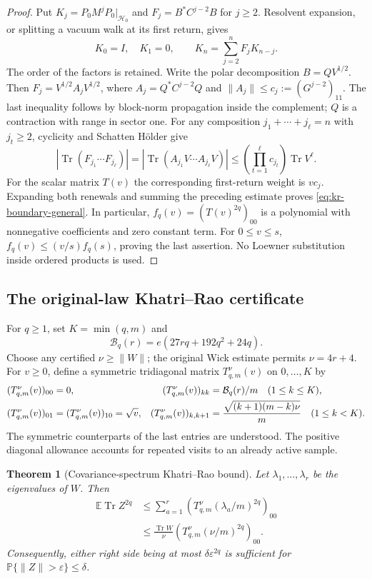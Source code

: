 \documentclass[11pt,a4paper]{article}
\newtheorem{theorem}{Theorem}[section]
\theoremstyle{definition}\newtheorem{definition}[theorem]{Definition}
\theoremstyle{remark}\newtheorem{remark}[theorem]{Remark}
\numberwithin{equation}{section}
\begin{document}
\begin{proof}
Put $K_j=P_0M^jP_0|_{\mathcal H_0}$ and $F_j=B^*C^{j-2}B$ for $j\ge2$.
Resolvent expansion, or splitting a vacuum walk at its first return, gives
\[
 K_0=I,\quad K_1=0,\qquad K_n=\sum_{j=2}^n F_jK_{n-j}.
\]
The order of the factors is retained. Write the polar decomposition
$B=QV^{1/2}$. Then
$F_j=V^{1/2}A_jV^{1/2}$, where
$A_j=Q^*C^{j-2}Q$ and $\|A_j\|\le c_j:=(G^{j-2})_{11}$.
The last inequality follows by block-norm propagation inside the complement;
$Q$ is a contraction with range in sector one.
For any composition $j_1+\cdots+j_\ell=n$ with $j_t\ge2$, cyclicity and
Schatten H\"older give
\[
 \left|\operatorname{Tr}(F_{j_1}\cdots F_{j_\ell})\right|
 =\left|\operatorname{Tr}(A_{j_1}V\cdots A_{j_\ell}V)\right|
 \le\left(\prod_{t=1}^{\ell}c_{j_t}\right)\operatorname{Tr}V^\ell.
\]
For the scalar matrix $T(v)$ the corresponding first-return weight is
$v c_j$. Expanding both renewals and summing the preceding estimate proves
\eqref{eq:kr-boundary-general}. In particular,
$f_q(v)=(T(v)^{2q})_{00}$ is a polynomial with nonnegative coefficients and
zero constant term. For $0\le v\le s$, $f_q(v)\le(v/s)f_q(s)$, proving the
last assertion. No Loewner substitution inside ordered products is used.
\end{proof}

\subsection{The original-law Khatri--Rao certificate}

For $q\ge1$, set $K=\min(q,m)$ and
\[
 \mathcal B_q(r)=e(27rq+192q^2+24q).
\]
Choose any certified $\nu\ge\|W\|$; the original Wick estimate permits
$\nu=4r+4$. For $v\ge0$, define a symmetric tridiagonal matrix
$T_{q,m}^{\nu}(v)$ on $0,\ldots,K$ by
\begin{align}
 (T_{q,m}^{\nu}(v))_{00}&=0,&
 (T_{q,m}^{\nu}(v))_{kk}&=\mathcal B_q(r)/m\quad(1\le k\le K),\notag\\
 (T_{q,m}^{\nu}(v))_{01}&=(T_{q,m}^{\nu}(v))_{10}=\sqrt v,&
 (T_{q,m}^{\nu}(v))_{k,k+1}
 &=\frac{\sqrt{(k+1)(m-k)\nu}}m\quad(1\le k<K).
 \label{eq:kr-T}
\end{align}
The symmetric counterparts of the last entries are understood. The positive
diagonal allowance accounts for repeated visits to an already active sample.

\begin{theorem}[Covariance-spectrum Khatri--Rao bound]\label{thm:kr-spectrum}
Let $\lambda_1,\ldots,\lambda_r$ be the eigenvalues of $W$. Then
\begin{align}
 \mathbb E\operatorname{Tr}Z^{2q}
 &\le\sum_{a=1}^r
   \left(T_{q,m}^{\nu}(\lambda_a/m)^{2q}\right)_{00}
 \label{eq:kr-spectrum}\\
 &\le\frac{\operatorname{Tr}W}{\nu}
   \left(T_{q,m}^{\nu}(\nu/m)^{2q}\right)_{00}.
 \label{eq:kr-effective}
\end{align}
Consequently, either right side being at most $\delta\varepsilon^{2q}$
is sufficient for $\mathbb P\{\|Z\|>\varepsilon\}\le\delta$.
\end{theorem}
\end{document}
